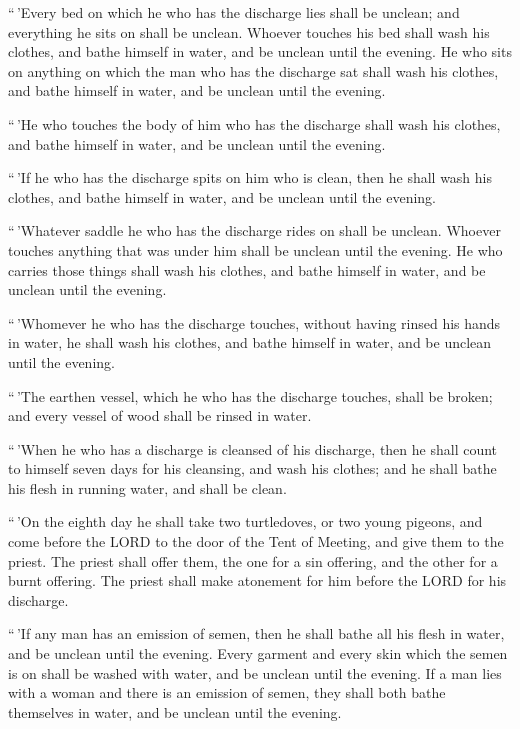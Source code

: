  ``\,'Every bed on which he who has the discharge lies shall
be unclean; and everything he sits on shall be unclean. 
Whoever touches his bed shall wash his clothes, and bathe himself in
water, and be unclean until the evening.  He who sits on
anything on which the man who has the discharge sat shall wash his
clothes, and bathe himself in water, and be unclean until the evening.

 ``\,'He who touches the body of him who has the discharge
shall wash his clothes, and bathe himself in water, and be unclean until
the evening.

 ``\,'If he who has the discharge spits on him who is clean,
then he shall wash his clothes, and bathe himself in water, and be
unclean until the evening.

 ``\,'Whatever saddle he who has the discharge rides on
shall be unclean.  Whoever touches anything that was under
him shall be unclean until the evening. He who carries those things
shall wash his clothes, and bathe himself in water, and be unclean until
the evening.

 ``\,'Whomever he who has the discharge touches, without
having rinsed his hands in water, he shall wash his clothes, and bathe
himself in water, and be unclean until the evening.

 ``\,'The earthen vessel, which he who has the discharge
touches, shall be broken; and every vessel of wood shall be rinsed in
water.

 ``\,'When he who has a discharge is cleansed of his
discharge, then he shall count to himself seven days for his cleansing,
and wash his clothes; and he shall bathe his flesh in running water, and
shall be clean.

 ``\,'On the eighth day he shall take two turtledoves, or
two young pigeons, and come before the LORD to the door of the Tent of
Meeting, and give them to the priest.  The priest shall
offer them, the one for a sin offering, and the other for a burnt
offering. The priest shall make atonement for him before the LORD for
his discharge.

 ``\,'If any man has an emission of semen, then he shall
bathe all his flesh in water, and be unclean until the evening.
 Every garment and every skin which the semen is on shall
be washed with water, and be unclean until the evening.  If
a man lies with a woman and there is an emission of semen, they shall
both bathe themselves in water, and be unclean until the evening.

